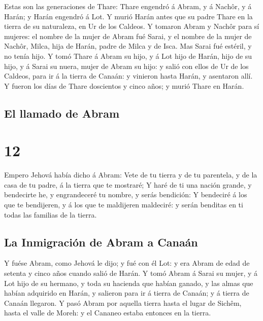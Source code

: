  Estas son las generaciones de Thare: Thare engendró á
Abram, y á Nachôr, y á Harán; y Harán engendró á Lot.  Y
murió Harán antes que su padre Thare en la tierra de su naturaleza, en
Ur de los Caldeos.  Y tomaron Abram y Nachôr para sí
mujeres: el nombre de la mujer de Abram fué Sarai, y el nombre de la
mujer de Nachôr, Milca, hija de Harán, padre de Milca y de Isca.
 Mas Sarai fué estéril, y no tenía hijo. 
Y tomó Thare á Abram su hijo, y á Lot hijo de Harán, hijo de su hijo, y
á Sarai su nuera, mujer de Abram su hijo: y salió con ellos de Ur de los
Caldeos, para ir á la tierra de Canaán: y vinieron hasta Harán, y
asentaron allí.  Y fueron los días de Thare doscientos y
cinco años; y murió Thare en Harán.

\hypertarget{el-llamado-de-abram}{%
\subsection{El llamado de Abram}\label{el-llamado-de-abram}}

\hypertarget{section-11}{%
\section{12}\label{section-11}}

 Empero Jehová había dicho á Abram: Vete de tu tierra y de
tu parentela, y de la casa de tu padre, á la tierra que te mostraré;
 Y haré de ti una nación grande, y bendecirte he, y
engrandeceré tu nombre, y serás bendición:  Y bendeciré á
los que te bendijeren, y á los que te maldijeren maldeciré: y serán
benditas en ti todas las familias de la tierra.

\hypertarget{la-inmigraciuxf3n-de-abram-a-canauxe1n}{%
\subsection{La Inmigración de Abram a
Canaán}\label{la-inmigraciuxf3n-de-abram-a-canauxe1n}}

 Y fuése Abram, como Jehová le dijo; y fué con él Lot: y
era Abram de edad de setenta y cinco años cuando salió de Harán.
 Y tomó Abram á Sarai su mujer, y á Lot hijo de su
hermano, y toda su hacienda que habían ganado, y las almas que habían
adquirido en Harán, y salieron para ir á tierra de Canaán; y á tierra de
Canaán llegaron.  Y pasó Abram por aquella tierra hasta el
lugar de Sichêm, hasta el valle de Moreh: y el Cananeo estaba entonces
en la tierra.

